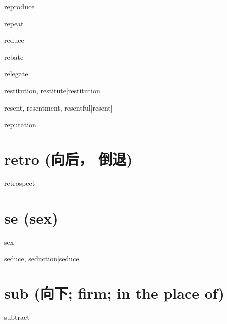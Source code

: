 \begin{RefWord}{reproduce}
\end{RefWord}

\begin{RefWord}{repeat}
\end{RefWord}

\begin{RefWord}{reduce}
\end{RefWord}

\begin{RefWord}{rebate}
\end{RefWord}

\begin{RefWord}{relegate}
\end{RefWord}

\begin{RefWord}{restitution, restitute}[restitution]
\end{RefWord}

\begin{RefWord}{resent, resentment, resentful}[resent]
\end{RefWord}

\begin{RefWord}{reputation}
\end{RefWord}

\section{retro (向后， 倒退)}
\begin{RefWord}{retrospect}
\end{RefWord}

\section{se (sex)}

\begin{RefWord}{sex}
\end{RefWord}

\begin{RefWord}{seduce, seduction}[seduce]
\end{RefWord}


\section{sub (向下; firm; in the place of)}

\begin{RefWord}{subtract}
\end{RefWord}

